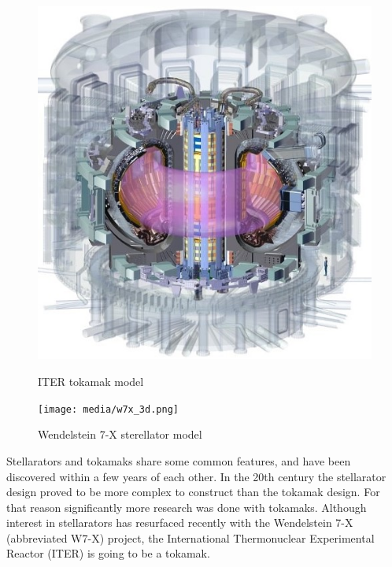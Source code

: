   \begin{figure}[H]
    \centering
    \begin{minipage}{.5\textwidth}
      \centering
      \includegraphics[width=\linewidth]{media/iter_reactor_3d.jpeg}
      \caption{ITER tokamak model \cite{iter_website}}
      \label{fig:iter_reactor}
    \end{minipage}%
    \begin{minipage}{.5\textwidth}
      \centering
	  \texttt{[image: media/w7x\_3d.png]}
      \caption{Wendelstein 7-X sterellator model \cite{w7x_website}}
      \label{fig:w7x_reactor}
    \end{minipage}
  \end{figure}

  Stellarators and tokamaks share some common features,
  and have been discovered within a few years of each other.
  In the 20th century the stellarator design proved 
  to be more complex to construct than the tokamak design.
  For that reason significantly more research was done with tokamaks.
  Although interest in stellarators has resurfaced recently with
  the Wendelstein 7-X (abbreviated W7-X) project,
  the International Thermonuclear Experimental Reactor (ITER)
  is going to be a tokamak.
  \cite{nuclear_fusion_status}

